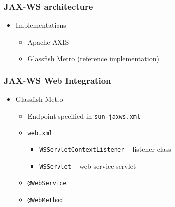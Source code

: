 \documentclass[10pt,xcolor=pdflatex]{beamer}
\begin{document}
\begin{frame}[containsverbatim]\frametitle{JAX-WS architecture}
\begin{itemize}
    \vspace{5.7cm}
	\item Implementations
      \begin{itemize}
    	\item Apache AXIS
		\item Glassfish Metro (reference implementation)
      \end{itemize}
\end{itemize}
\end{frame}


\begin{frame}[containsverbatim]\frametitle{JAX-WS Web Integration}
\begin{itemize}
	\item Glassfish Metro
	  \begin{itemize}
		\item Endpoint specified in \texttt{sun-jaxws.xml}
		\item \texttt{web.xml}
          \begin{itemize}
            \item \texttt{WSServletContextListener} --  listener class
            \item \texttt{WSServlet} -- web service servlet
          \end{itemize}
    	\item \texttt{@WebService}
		\item \texttt{@WebMethod}
      \end{itemize}
\end{itemize}
\end{frame}
\end{document}
